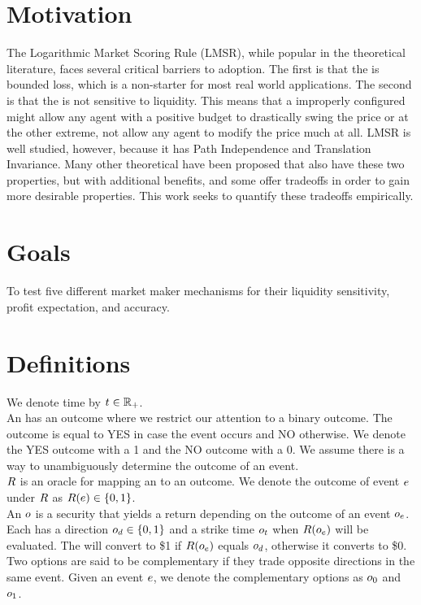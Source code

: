 \section{Motivation}
The Logarithmic Market Scoring Rule (LMSR), while popular in the theoretical
literature, faces several critical barriers to adoption. The first is that
the  is bounded loss, which is a non-starter for most
real world applications. The second is that the  is not
sensitive to liquidity. This means that a improperly configured 
might allow any agent with a positive budget to drastically swing the price or at
the other extreme, not allow any agent to modify the price much at all. LMSR is
well studied, however, because it has Path Independence and Translation Invariance.
Many other theoretical  have been proposed that also have
these two properties, but with additional benefits, and some offer tradeoffs in
order to gain more desirable properties. This work seeks to quantify these
tradeoffs empirically.

\section{Goals}
To test five different market maker mechanisms for their liquidity sensitivity,
profit expectation, and accuracy.  


\section{Definitions}

We denote time by $t\in\mathbb{R}_+$. \\%

An  has an outcome where we restrict our attention to a binary outcome. 
The outcome is equal to YES in case the event occurs and NO otherwise. 
We denote the YES outcome with a 1 and the NO outcome with a 0.
We assume there is a way to unambiguously determine the outcome of an event. \\

$R$ is an oracle for mapping an  to an outcome.
We denote the outcome of event $e$ under $R$ as $R(e) \in \{0,1\}$.\\

An  $o$ is a security that yields a return depending on the outcome of an 
event $o_e$. Each  has a direction $o_d \in \{0, 1\}$
and a strike time $o_t$ when $R(o_e)$ will be evaluated. 
The  will convert to \$1 if $R(o_e)$ equals 
$o_d$, otherwise it converts to \$0. Two options are said to be
complementary if they trade opposite directions in the same event. Given an
event $e$, we denote the complementary options as 
$o_{0}$ and $o_{1}$.
\\


